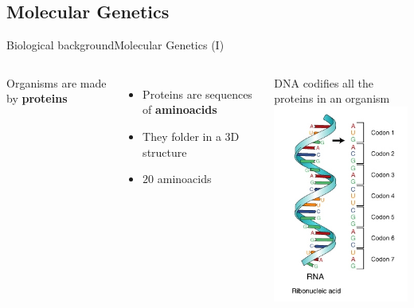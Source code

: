 \documentclass[10pt,compress]{beamer} %
\begin{document}
\subsection{Molecular Genetics}
\begin{frame}{Biological background}{Molecular Genetics (I)}
    \begin{columns}
		Organisms are made by \textbf{proteins}

 	 	\begin{itemize}
		\item Proteins are sequences of \textbf{aminoacids}
		\item They folder in a 3D structure
		\item $20$ aminoacids
		\end{itemize}
		DNA codifies all the proteins in an organism\\
		\centering\includegraphics[width=\linewidth]{figs/codones.jpg}
	\end{columns}
\end{frame}
\end{document}
